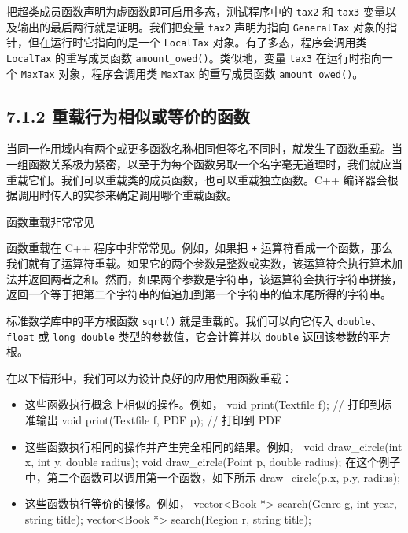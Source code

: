 把超类成员函数声明为虚函数即可启用多态，测试程序中的 \texttt{tax2} 和 \texttt{tax3} 变量以及输出的最后两行就是证明。我们把变量 \texttt{tax2} 声明为指向 \texttt{General\allowbreak{}Tax} 对象的指针，但在运行时它指向的是一个 \texttt{LocalTax} 对象。有了多态，程序会调用类 \texttt{LocalTax} 的重写成员函数 \texttt{amount\_\allowbreak{}owed(\allowbreak{})\allowbreak{}}。类似地，变量 \texttt{tax3} 在运行时指向一个 \texttt{MaxTax} 对象，程序会调用类 \texttt{MaxTax} 的重写成员函数 \texttt{amount\_\allowbreak{}owed(\allowbreak{})\allowbreak{}}。

\subsection{7.1.2 重载行为相似或等价的函数}

当同一作用域内有两个或更多函数名称相同但签名不同时，就发生了函数重载。当一组函数关系极为紧密，以至于为每个函数另取一个名字毫无道理时，我们就应当重载它们。我们可以重载类的成员函数，也可以重载独立函数。C++ 编译器会根据调用时传入的实参来确定调用哪个重载函数。

\begin{mySidebar}{函数重载非常常见}

函数重载在 C++ 程序中非常常见。例如，如果把 \texttt{+} 运算符看成一个函数，那么我们就有了运算符重载。如果它的两个参数是整数或实数，该运算符会执行算术加法并返回两者之和。然而，如果两个参数是字符串，该运算符会执行字符串拼接，返回一个等于把第二个字符串的值追加到第一个字符串的值末尾所得的字符串。

标准数学库中的平方根函数 \texttt{sqrt()} 就是重载的。我们可以向它传入 \texttt{double}、\texttt{float} 或 \texttt{long double} 类型的参数值，它会计算并以 \texttt{double} 返回该参数的平方根。
\end{mySidebar}

在以下情形中，我们可以为设计良好的应用使用函数重载：

\begin{itemize}
\item 这些函数执行概念上相似的操作。例如， void print(Textfile f); // 打印到标准输出 void print(Textfile f, PDF p); // 打印到 PDF
\item 这些函数执行相同的操作并产生完全相同的结果。例如， void draw\_circle(int x, int y, double radius); void draw\_circle(Point p, double radius); 在这个例子中，第二个函数可以调用第一个函数，如下所示 draw\_circle(p.x, p.y, radius);
\item 这些函数执行等价的操恀。例如， vector<Book *> search(Genre g, int year, string title); vector<Book *> search(Region r, string title);
\end{itemize}

